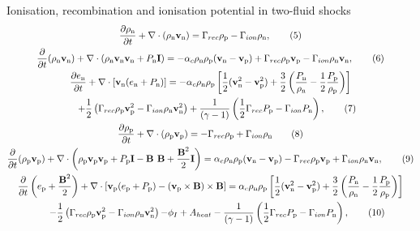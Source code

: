 \documentclass[10pt,aspectratio=169,usenames,dvipsnames]{beamer}
\begin{document}
\begin{frame}{Ionisation, recombination and ionisation potential in two-fluid shocks}
\footnotesize
\begin{gather}
\frac{\partial \rho _{\text{n}}}{\partial t} + \nabla \cdot (\rho _{\text{n}} \textbf{v}_{\text{n}})= \Gamma _{rec} \rho _{\rm p} - \Gamma _{ion} \rho _{\rm n}, \label{eqn:neutral1}\tag{5} \\
\frac{\partial}{\partial t}(\rho _{\text{n}} \textbf{v}_{\text{n}}) + \nabla \cdot (\rho _{\text{n}} \textbf{v}_{\text{n}} \textbf{v}_{\text{n}} + P_{\text{n}} \textbf{I}) = -\alpha _c \rho_{\text{n}} \rho_{\text{p}} (\textbf{v}_{\text{n}}-\textbf{v}_{\text{p}}) + \Gamma _{rec} \rho _{\rm p} \textbf{v}_{\rm p} - \Gamma _{ion} \rho_{\rm n} \textbf{v}_{\rm n}, \tag{6}\\
\frac{\partial e_{\text{n}}}{\partial t} + \nabla \cdot \left[\textbf{v}_{\text{n}} (e_{\text{n}} +P_{\text{n}}) \right] = -\alpha _c \rho _{\text{n}} \rho _{\text{p}} \left[ \frac{1}{2} (\textbf{v}_{\text{n}} ^2 - \textbf{v}_{\text{p}} ^2)+ \frac{3}{2} \left(\frac{P_{\rm n}}{\rho_{\rm n}}-\frac{1}{2}\frac{P_{\rm p}}{\rho_{\rm p}}\right) \right] \nonumber \\ \hspace{0.5cm}+ \frac{1}{2} \left( \Gamma _{rec} \rho _{\rm p} \textbf{v}_{\rm p} ^2 - \Gamma _{ion} \rho _{\rm n} \textbf{v}_{\rm n} ^2 \right) +\frac{1}{ (\gamma-1)} \left( \frac{1}{2} \Gamma _{rec} P_{\rm p} -\Gamma _{ion} P_{\rm n} \right), \tag{7}\\
\frac{\partial \rho _{\text{p}}}{\partial t} + \nabla \cdot (\rho_{\text{p}} \textbf{v}_{\text{p}}) = - \Gamma _{rec} \rho _{\rm p} + \Gamma _{ion} \rho _{\rm n} \label{eqn:plasma1}\tag{8}\\
\frac{\partial}{\partial t} (\rho_{\text{p}} \textbf{v}_{\text{p}})+ \nabla \cdot \left( \rho_{\text{p}} \textbf{v}_{\text{p}} \textbf{v}_{\text{p}} + P_{\text{p}} \textbf{I} - \textbf{B B} + \frac{\textbf{B}^2}{2} \textbf{I} \right) = \alpha _c \rho_{\text{n}} \rho_{\text{p}}(\textbf{v}_{\text{n}} - \textbf{v}_{\text{p}}) - \Gamma _{rec} \rho _{\rm p} \textbf{v}_{\rm p} + \Gamma _{ion} \rho_{\rm n} \textbf{v}_{\rm n},\tag{9}\\
\frac{\partial}{\partial t} \left( e_{\text{p}} + \frac{\textbf{B}^2}{2} \right) + \nabla \cdot \left[ \textbf{v}_{\text{p}} ( e_{\text{p}} + P_{\text{p}}) -  (\textbf{v}_{\rm p} \times \textbf{B}) \times \textbf{B} \right]  =  \alpha _c \rho _{\text{n}} \rho _{\text{p}} \left[ \frac{1}{2} (\textbf{v}_{\text{n}} ^2 - \textbf{v}_{\text{p}} ^2)+ \frac{3}{2} \left(\frac{P_{\rm n}}{\rho_{\rm n}}-\frac{1}{2}\frac{P_{\rm p}}{\rho_{\rm p}}\right) \right] \nonumber \\ \hspace{0.5cm}- \frac{1}{2} \left( \Gamma _{rec} \rho _{\rm p} \textbf{v}_{\rm p} ^2 - \Gamma _{ion} \rho _{\rm n} \textbf{v}_{\rm n} ^2 \right) {- \phi_I + A_{heat}} -\frac{1}{ (\gamma-1)} \left( \frac{1}{2} \Gamma _{rec} P_{\rm p} -\Gamma _{ion} P_{\rm n} \right), \label{eqn:ep}\tag{10} \\

\end{gather}
\end{frame}
\end{document}
